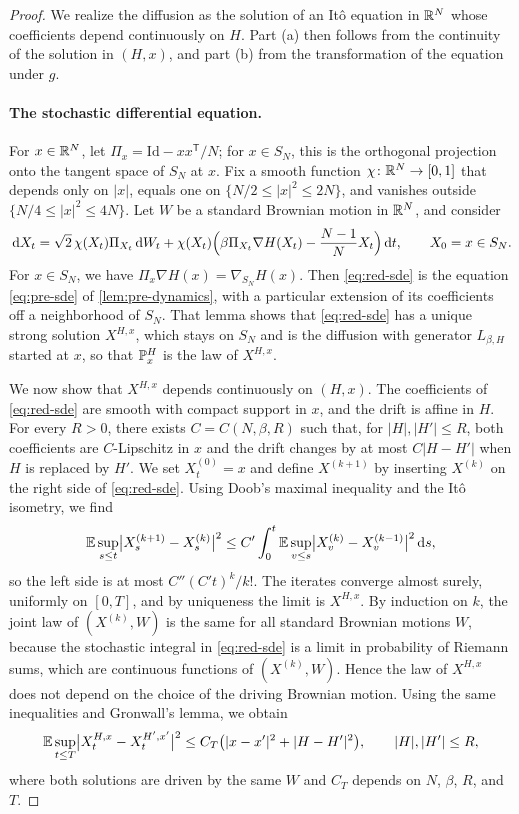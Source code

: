 \begin{proof}
We realize the diffusion as the solution of an It\^o equation in $\mathbb R^N$ whose coefficients depend continuously on $H$. Part (a) then follows from the continuity of the solution in $(H,x)$, and part (b) from the transformation of the equation under $g$.

\paragraph{The stochastic differential equation.}
For $x\in\mathbb R^N$, let $\Pi_x=\mathrm{Id}-xx^{\mathsf T}/N$; for $x\in S_N$, this is the orthogonal projection onto the tangent space of $S_N$ at $x$. Fix a smooth function $\chi\colon\mathbb R^N\to[0,1]$ that depends only on $|x|$, equals one on $\{N/2\le|x|^2\le2N\}$, and vanishes outside $\{N/4\le|x|^2\le4N\}$. Let $W$ be a standard Brownian motion in $\mathbb R^N$, and consider
\begin{equation}\label{eq:red-sde}
\,\mathrm d X_t=\sqrt2\,\chi(X_t)\Pi_{X_t}\,\mathrm d W_t+\chi(X_t)\Bigl(\beta\Pi_{X_t}\nabla H(X_t)-\frac{N-1}{N}X_t\Bigr)\,\mathrm d t,\qquad X_0=x\in S_N.
\end{equation}
For $x\in S_N$, we have $\Pi_x\nabla H(x)=\nabla_{S_N}H(x)$. Then \eqref{eq:red-sde} is the equation \eqref{eq:pre-sde} of \cref{lem:pre-dynamics}, with a particular extension of its coefficients off a neighborhood of $S_N$. That lemma shows that \eqref{eq:red-sde} has a unique strong solution $X^{H,x}$, which stays on $S_N$ and is the diffusion with generator $L_{\beta,H}$ started at $x$, so that $\mathbb P^H_x$ is the law of $X^{H,x}$.

We now show that $X^{H,x}$ depends continuously on $(H,x)$. The coefficients of \eqref{eq:red-sde} are smooth with compact support in $x$, and the drift is affine in $H$. For every $R>0$, there exists $C=C(N,\beta,R)$ such that, for $|H|,|H'|\le R$, both coefficients are $C$-Lipschitz in $x$ and the drift changes by at most $C|H-H'|$ when $H$ is replaced by $H'$. We set $X^{(0)}_t=x$ and define $X^{(k+1)}$ by inserting $X^{(k)}$ on the right side of \eqref{eq:red-sde}. Using Doob's maximal inequality and the It\^o isometry, we find
\begin{equation*}
\mathbb E\sup_{s\le t}\bigl|X^{(k+1)}_s-X^{(k)}_s\bigr|^2\le C'\int_0^t\mathbb E\sup_{v\le s}\bigl|X^{(k)}_v-X^{(k-1)}_v\bigr|^2\,\mathrm d s,
\end{equation*}
so the left side is at most $C''(C't)^k/k!$. The iterates converge almost surely, uniformly on $[0,T]$, and by uniqueness the limit is $X^{H,x}$. By induction on $k$, the joint law of $(X^{(k)},W)$ is the same for all standard Brownian motions $W$, because the stochastic integral in \eqref{eq:red-sde} is a limit in probability of Riemann sums, which are continuous functions of $(X^{(k)},W)$. Hence the law of $X^{H,x}$ does not depend on the choice of the driving Brownian motion. Using the same inequalities and Gronwall's lemma, we obtain
\begin{equation}\label{eq:red-stability}
\mathbb E\sup_{t\le T}\bigl|X^{H,x}_t-X^{H',x'}_t\bigr|^2\le C_T\bigl(|x-x'|^2+|H-H'|^2\bigr),\qquad|H|,|H'|\le R,
\end{equation}
where both solutions are driven by the same $W$ and $C_T$ depends on $N$, $\beta$, $R$, and $T$.


\end{proof}

